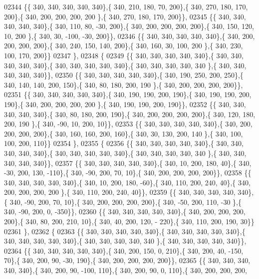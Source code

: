 \begin{DoxyCode}
02344 \{\{ 340, 340, 340, 340, 340\},\{ 340, 210, 180,  70, 200\},\{ 340, 270, 180, 170, 200\},\{ 340, 200, 200, 200, 200
      \},\{ 340, 270, 180, 170, 200\}\},
02345 \{\{ 340, 340, 340, 340, 340\},\{ 340, 110,  80, -30, 200\},\{ 340, 200, 200, 200, 200\},\{ 340, 150, 120,  10, 200
      \},\{ 340,  30, -100, -30, 200\}\},
02346 \{\{ 340, 340, 340, 340, 340\},\{ 340, 200, 200, 200, 200\},\{ 340, 240, 150, 140, 200\},\{ 340, 160,  30, 100, 200
      \},\{ 340, 230, 100, 170, 200\}\}
02347 \},
02348 \{
02349 \{\{ 340, 340, 340, 340, 340\},\{ 340, 340, 340, 340, 340\},\{ 340, 340, 340, 340, 340\},\{ 340, 340, 340, 340, 340
      \},\{ 340, 340, 340, 340, 340\}\},
02350 \{\{ 340, 340, 340, 340, 340\},\{ 340, 190, 250, 200, 250\},\{ 340, 140, 140, 200, 150\},\{ 340,  80, 180, 200, 190
      \},\{ 340, 200, 200, 200, 200\}\},
02351 \{\{ 340, 340, 340, 340, 340\},\{ 340, 190, 190, 200, 190\},\{ 340, 190, 190, 200, 190\},\{ 340, 200, 200, 200, 200
      \},\{ 340, 190, 190, 200, 190\}\},
02352 \{\{ 340, 340, 340, 340, 340\},\{ 340,  80, 180, 200, 190\},\{ 340, 200, 200, 200, 200\},\{ 340, 120, 180, 200, 190
      \},\{ 340, -90,  10, 200,  10\}\},
02353 \{\{ 340, 340, 340, 340, 340\},\{ 340, 200, 200, 200, 200\},\{ 340, 160, 160, 200, 160\},\{ 340,  30, 130, 200, 140
      \},\{ 340, 100, 100, 200, 110\}\}
02354 \},
02355 \{
02356 \{\{ 340, 340, 340, 340, 340\},\{ 340, 340, 340, 340, 340\},\{ 340, 340, 340, 340, 340\},\{ 340, 340, 340, 340, 340
      \},\{ 340, 340, 340, 340, 340\}\},
02357 \{\{ 340, 340, 340, 340, 340\},\{ 340,  10, 200, 180,  40\},\{ 340, -30, 200, 130, -110\},\{ 340, -90, 200,  70,  
      10\},\{ 340, 200, 200, 200, 200\}\},
02358 \{\{ 340, 340, 340, 340, 340\},\{ 340,  10, 200, 180, -60\},\{ 340, 110, 200, 240,  40\},\{ 340, 200, 200, 200, 200
      \},\{ 340, 110, 200, 240,  40\}\},
02359 \{\{ 340, 340, 340, 340, 340\},\{ 340, -90, 200,  70,  10\},\{ 340, 200, 200, 200, 200\},\{ 340, -50, 200, 110, -30
      \},\{ 340, -90, 200,   0, -350\}\},
02360 \{\{ 340, 340, 340, 340, 340\},\{ 340, 200, 200, 200, 200\},\{ 340,  80, 200, 210,  10\},\{ 340,  40, 200, 120, -
      220\},\{ 340, 110, 200, 190,  30\}\}
02361 \},
02362 \{
02363 \{\{ 340, 340, 340, 340, 340\},\{ 340, 340, 340, 340, 340\},\{ 340, 340, 340, 340, 340\},\{ 340, 340, 340, 340, 340
      \},\{ 340, 340, 340, 340, 340\}\},
02364 \{\{ 340, 340, 340, 340, 340\},\{ 340, 200, 150,   0, 210\},\{ 340, 200,  40, -150,  70\},\{ 340, 200,  90, -30, 
      190\},\{ 340, 200, 200, 200, 200\}\},
02365 \{\{ 340, 340, 340, 340, 340\},\{ 340, 200,  90, -100, 110\},\{ 340, 200,  90,   0, 110\},\{ 340, 200, 200, 200, 

\end{DoxyCode}
